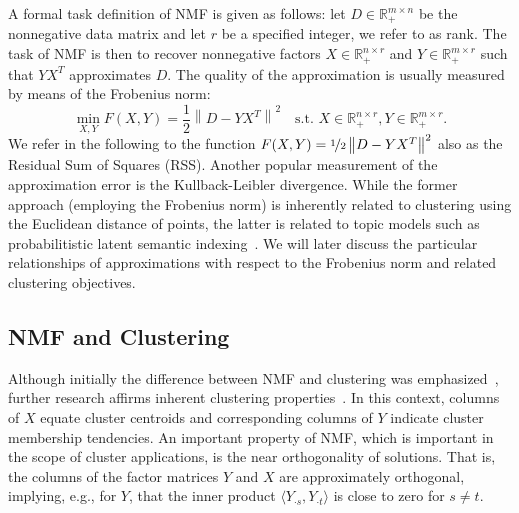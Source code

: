 A formal task definition of NMF is given as follows: let $D\in\mathbb{R}_+^{m\times n}$ be the nonnegative data matrix and let $r$ be a specified integer, we refer to as rank. The task of NMF is then to recover nonnegative factors $X\in \mathbb{R}_+^{n\times r}$ and $Y\in \mathbb{R}_+^{m\times r}$ such that $YX^T$ approximates $D$. The quality of the approximation is usually measured by means of the Frobenius norm:
\begin{equation}
	\min_{X,Y} F(X,Y) = \frac{1}{2}\left\|D-YX^T\right\|^2 \quad \text{s.t. }X\in \mathbb{R}_+^{n\times r}, Y\in \mathbb{R}_+^{m\times r}.\label{eq:NMF} \tag{NMF}
\end{equation}
We refer in the following to the function $F(X,Y)=\nicefrac{1}{2}\left\|D-YX^T\right\|^2$ also as the Residual Sum of Squares (RSS). Another popular measurement of the approximation error is the Kullback-Leibler divergence. While the former approach (employing the Frobenius norm) is inherently related to clustering using the Euclidean distance of points, the latter is related to topic models such as probabilitistic latent semantic indexing~\citep{gaussier2005relation,ding2006nonnegative}. We will later discuss the particular relationships of approximations with respect to the Frobenius norm and related clustering objectives. 
\subsection{NMF and Clustering} \label{sec:ZS:NMFClus}
Although initially the difference between NMF and clustering was emphasized~\citep{lee1999learning}, further research affirms inherent clustering properties~\citep{li2006relationships}. In this context, columns of $X$ equate cluster centroids and corresponding columns of $Y$ indicate cluster membership tendencies.
An important property of NMF, which is important in the scope of cluster applications, is the near orthogonality of solutions. That is, the columns of the factor matrices $Y$ and $X$ are approximately orthogonal, implying, e.g., for $Y$, that the inner product $\langle Y_{\cdot s},Y_{\cdot t}\rangle$ is close to zero for $s\neq t$.    

